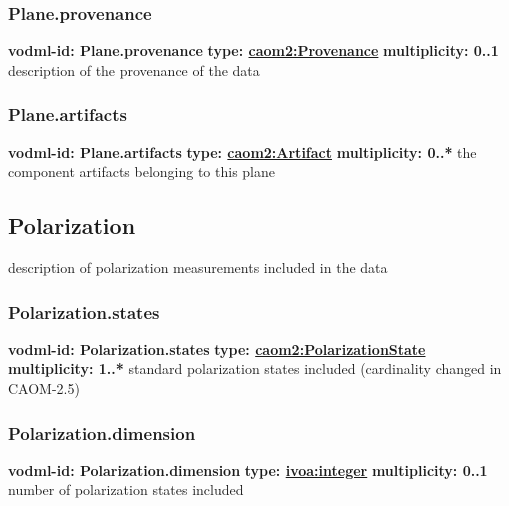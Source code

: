     \subsubsection{Plane.provenance}
      \textbf{vodml-id: Plane.provenance} \newline
      \textbf{type: \hyperref[sect:Provenance]{caom2:Provenance}} \newline
      \textbf{multiplicity: 0..1} \newline
      description of the provenance of the data

    \subsubsection{Plane.artifacts}
      \textbf{vodml-id: Plane.artifacts} \newline
      \textbf{type: \hyperref[sect:Artifact]{caom2:Artifact}} \newline
      \textbf{multiplicity: 0..*} \newline
      the component artifacts belonging to this plane

  \subsection{Polarization}
  \label{sect:Polarization}
    description of polarization measurements included in the data

    \subsubsection{Polarization.states}
      \textbf{vodml-id: Polarization.states} \newline
      \textbf{type: \hyperref[sect:PolarizationState]{caom2:PolarizationState}} \newline
      \textbf{multiplicity: 1..*} \newline
      standard polarization states included (cardinality changed in CAOM-2.5)

    \subsubsection{Polarization.dimension}
      \textbf{vodml-id: Polarization.dimension} \newline
      \textbf{type: \hyperref[sect:ivoa]{ivoa:integer}} \newline
      \textbf{multiplicity: 0..1} \newline
      number of polarization states included

